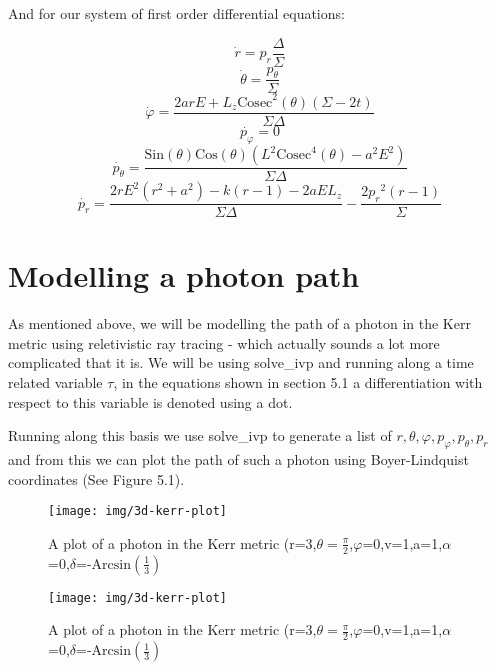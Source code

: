 \documentclass[oneside,openright,frontopenright]{dmathesis}
\begin{document}
	And for our system of first order differential equations:

	\[\dot{r} = p_r\frac{\Delta}{\Sigma}\]
	\[\dot{\theta} = \frac{p_\theta}{\Sigma}\]
	\[\dot{\varphi} = \frac{2arE+L_{z}\mbox{Cosec}^2(\theta)(\Sigma-2t)}{\Sigma\Delta}\]
	\[\dot{p_{\varphi}} = 0\]
	\[\dot{p_{\theta}} = \frac{\mbox{Sin}(\theta)\mbox{Cos}(\theta)(L^2\mbox{Cosec}^4(\theta)-a^2E^2)}{\Sigma\Delta}\]
	\[\dot{p_{r}} = \frac{2rE^2(r^2+a^2)-k(r-1)-2aEL_{z}}{\Sigma\Delta}-\frac{2{p_{r}}^2(r-1)}{\Sigma}\]

\section{Modelling a photon path}

	As mentioned above, we will be modelling the path of a photon in the Kerr metric using reletivistic ray tracing - which actually sounds a lot more complicated that it is. We will be using solve\_ivp and running along a time related variable $\tau$, in the equations shown in section 5.1 a differentiation with respect to this variable is denoted using a dot.

	Running along this basis we use solve\_ivp to generate a list of $r,\theta,\varphi,p_{\varphi},p_{\theta},p_{r}$ and from this we can plot the path of such a photon using Boyer-Lindquist coordinates (See Figure 5.1).

\begin{figure}
	\centering
	\begin{minipage}{0.5\textwidth}
		\centering
		\texttt{[image: img/3d-kerr-plot]}
		\caption{A plot of a photon in the Kerr metric (r=3,$\theta=\frac{\pi}{2}$,$\varphi$=0,v=1,a=1,$\alpha$=0,$\delta$=-$\mbox{Arcsin}(\frac{1}{3})$}
	\end{minipage}%
	\begin{minipage}{0.5\textwidth}
		\centering
		\texttt{[image: img/3d-kerr-plot]}
		\caption{A plot of a photon in the Kerr metric (r=3,$\theta=\frac{\pi}{2}$,$\varphi$=0,v=1,a=1,$\alpha$=0,$\delta$=-$\mbox{Arcsin}(\frac{1}{3})$}
	\end{minipage}
\end{figure}



\appendix
%
%


{}
\end{document}
